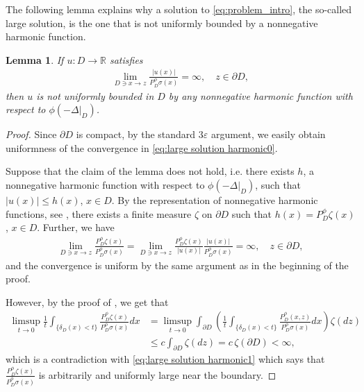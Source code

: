 \documentclass[12pt,a4paper,onecolumn]{amsart}
\newtheorem{lem}[thm]{Lemma}
\theoremstyle{definition}
\newcommand{\R}{\mathbb{R}}
\newcommand{\1}{\mathbf 1}
\newcommand{\Lo}{\phi(-\left.\Delta\right\vert_{D})}
\newcommand{\PDfi}{P^\phi_{ D}}
\newcommand{\PDFI}{\PDfi}
\newcommand{\de}{\delta_D}
\numberwithin{equation}{section}
\begin{document}
The following lemma explains why a solution to \eqref{eq:problem_intro}, the so-called large solution, is the one that is not uniformly bounded by a nonnegative harmonic function.
\begin{lem}\label{l:large solution harmonic unbounded}    
    If $u:D\to \R$ satisfies 
    \begin{align}\label{eq:large solution harmonic0}
        \lim_{D\ni x\to z}\frac{|u(x)|}{\PDFI\sigma(x)}=\infty,\quad z\in\partial D,
    \end{align}
    then $u$ is not uniformly bounded in $D$ by any nonnegative harmonic function with respect to $\Lo$.
\end{lem}

\begin{proof}
    Since $\partial D$ is compact, by the standard $3\varepsilon$ argument, we easily obtain uniformness of the convergence in \eqref{eq:large solution harmonic0}.
    
    Suppose that the claim of the lemma does not hold, i.e. there exists $h$, a nonnegative harmonic function with respect to $\Lo$, such that $|u(x)|\le h(x)$, $x\in D$. By the representation of nonnegative harmonic functions, see \cite[Theorem 2.23]{Bio23}, there exists a finite measure $\zeta$ on $\partial D$ such that $h(x)=\PDFI\zeta(x)$, $x\in D$. Further, we have
    \begin{align}\label{eq:large solution harmonic1}
        \lim_{D\ni x\to z}\frac{\PDFI\zeta(x)}{\PDFI\sigma(x)}=\lim_{D\ni x\to z}\frac{\PDFI\zeta(x)}{|u(x)|}\frac{|u(x)|}{\PDFI\sigma(x)}=\infty,\quad z\in \partial D,
    \end{align}
    and the convergence is uniform by the same argument as in the beginning of the proof.

    However, by the proof of \cite[Proposition 3.5]{Bio23}, we get that
    \begin{align*}
        \limsup_{t\to 0}\frac{1}{t}\int_{\{\de(x)<t\}}\frac{\PDFI\zeta(x)}{\PDFI\sigma(x)}dx&=\limsup_{t\to 0}\int_{\partial D}\left(\frac{1}{t}\int_{\{\de(x)<t\}}\frac{\PDFI(x,z)}{\PDFI\sigma(x)}dx\right)\zeta(dz)\\
        &\le c\int_{\partial D} \zeta(dz)=c\,\zeta(\partial D)<\infty,
    \end{align*}
    which is a contradiction with \eqref{eq:large solution harmonic1} which says that $\frac{\PDFI\zeta(x)}{\PDFI\sigma(x)}$ is arbitrarily and uniformly large near the boundary.
\end{proof}
\end{document}
